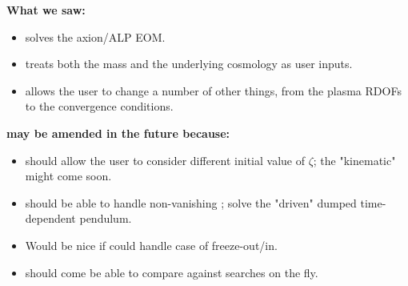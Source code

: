 \documentclass[10pt,utf8,compress,xcolor=dvipsnames]{beamer}
\begin{document}
\begin{frame}[fragile]{\insertsectionhead}
	\begin{center}
		\bf{What we saw:}
	\end{center}
	\begin{itemize}
		\item \mimes solves the axion/ALP EOM. 
		\item \mimes treats both the mass and the underlying cosmology as user inputs.
		\item \mimes allows the user to change a number of other things, from the plasma RDOFs to the convergence conditions.\\[0.5cm] 
	\end{itemize}

	\begin{center}
		\bf{\mimes may be amended in the future because:} 
	\end{center}
	\begin{itemize}
		\item \mimes should allow the user to consider different initial value of $\zeta$; the "kinematic" \mimes might come soon.
		\item \mimes should be able to handle non-vanishing \rhs; \ie solve the "driven" dumped time-dependent pendulum.
		\item Would be nice if \mimes could handle case of freeze-out/in.
		\item \mimes should come be able to compare against searches on the fly. 
	\end{itemize}
	
\end{frame}
\end{document}
